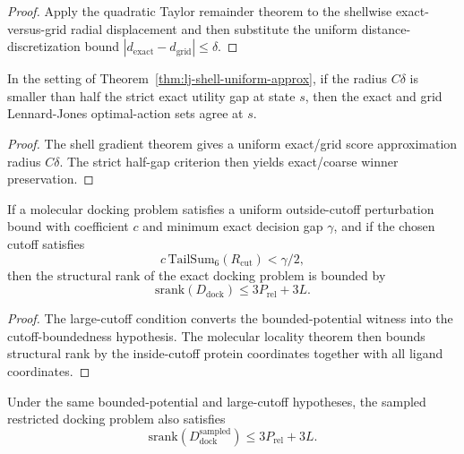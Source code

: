 \begin{proof}
Apply the quadratic Taylor remainder theorem to the shellwise exact-versus-grid radial displacement and then substitute the uniform distance-discretization bound $|d_{\mathrm{exact}}-d_{\mathrm{grid}}| \le \delta$.
\end{proof}

\begin{theorem}\label{thm:lj-shell-gap-invariance}
In the setting of Theorem~\ref{thm:lj-shell-uniform-approx}, if the radius $C\delta$ is smaller than half the strict exact utility gap at state $s$, then the exact and grid Lennard-Jones optimal-action sets agree at $s$.
\end{theorem}

\begin{proof}
The shell gradient theorem gives a uniform exact/grid score approximation radius $C\delta$. The strict half-gap criterion then yields exact/coarse winner preservation.
\end{proof}

\begin{theorem}\label{thm:bounded-potential-large-cutoff-srank}
If a molecular docking problem satisfies a uniform outside-cutoff perturbation bound with coefficient $c$ and minimum exact decision gap $\gamma$, and if the chosen cutoff satisfies
\[
c\,\mathrm{TailSum}_6(R_{\mathrm{cut}}) < \gamma/2,
\]
then the structural rank of the exact docking problem is bounded by
\[
\mathrm{srank}(D_{\mathrm{dock}}) \le 3P_{\mathrm{rel}} + 3L.
\]
\end{theorem}

\begin{proof}
The large-cutoff condition converts the bounded-potential witness into the cutoff-boundedness hypothesis. The molecular locality theorem then bounds structural rank by the inside-cutoff protein coordinates together with all ligand coordinates.
\end{proof}

\begin{theorem}\label{thm:bounded-potential-large-cutoff-sampled-srank}
Under the same bounded-potential and large-cutoff hypotheses, the sampled restricted docking problem also satisfies
\[
\mathrm{srank}(D_{\mathrm{dock}}^{\mathrm{sampled}}) \le 3P_{\mathrm{rel}} + 3L.
\]
\end{theorem}

